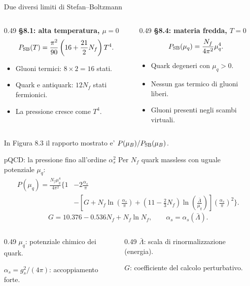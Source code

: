 \begin{frame}{Due diversi limiti di Stefan--Boltzmann}
\small
\begin{columns}[T,onlytextwidth]
\begin{column}{0.49\textwidth}
\textbf{\S8.1: alta temperatura, $\mu=0$}
\[
P_{\rm SB}(T)=\frac{\pi^2}{90}
\left(16+\frac{21}{2}N_f\right)T^4.
\]
\begin{itemize}
\item Gluoni termici: $8\times2=16$ stati.
\item Quark e antiquark: $12N_f$ stati fermionici.
\item La pressione cresce come $T^4$.
\end{itemize}
\end{column}
\begin{column}{0.49\textwidth}
\textbf{\S8.4: materia fredda, $T=0$}
\[
P_{\rm SB}(\mu_q)=
\frac{N_f}{4\pi^2}\mu_q^4.
\]
\begin{itemize}
\item Quark degeneri con $\mu_q>0$.
\item Nessun gas termico di gluoni liberi.
\item Gluoni presenti negli scambi virtuali.
\end{itemize}
\end{column}
\end{columns}
\medskip
In Figura 8.3 il rapporto mostrato e' $P(\mu_B)/P_{\rm SB}(\mu_B)$.
\end{frame}

\begin{frame}{pQCD: la pressione fino all'ordine $\alpha_s^2$}
\footnotesize
Per $N_f$ quark massless con uguale potenziale $\mu_q$:
\[
\begin{aligned}
P(\mu_q)=\frac{N_f\mu_q^4}{4\pi^2}
\Bigg\{1
&-2\frac{\alpha_s}{\pi}\\[-1mm]
&-\left[
G+N_f\ln\!\left(\frac{\alpha_s}{\pi}\right)
+\left(11-\frac23N_f\right)
\ln\!\left(\frac{\bar\Lambda}{\mu_q}\right)
\right]
\left(\frac{\alpha_s}{\pi}\right)^2\Bigg\}.
\end{aligned}
\]
\[
G=10.376-0.536N_f+N_f\ln N_f,
\qquad \alpha_s=\alpha_s(\bar\Lambda).
\]
\begin{columns}[T,onlytextwidth]
\begin{column}{0.49\textwidth}
$\mu_q$: potenziale chimico dei quark.

$\alpha_s=g_s^2/(4\pi)$: accoppiamento forte.
\end{column}
\begin{column}{0.49\textwidth}
$\bar\Lambda$: scala di rinormalizzazione (energia).

$G$: coefficiente del calcolo perturbativo.
\end{column}
\end{columns}
\end{frame}

